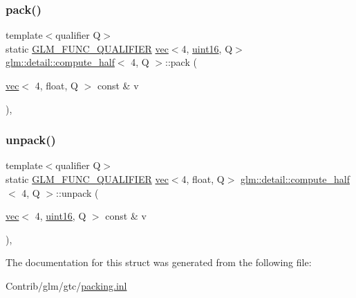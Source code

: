 \subsubsection{\texorpdfstring{pack()}{pack()}}
{\footnotesize\ttfamily template$<$qualifier Q$>$ \\
static \mbox{\hyperlink{setup_8hpp_a33fdea6f91c5f834105f7415e2a64407}{G\+L\+M\+\_\+\+F\+U\+N\+C\+\_\+\+Q\+U\+A\+L\+I\+F\+I\+ER}} \mbox{\hyperlink{structglm_1_1vec}{vec}}$<$4, \mbox{\hyperlink{namespaceglm_1_1detail_a47b2a7d006d187338e8031a352d1ce56}{uint16}}, Q$>$ \mbox{\hyperlink{structglm_1_1detail_1_1compute__half}{glm\+::detail\+::compute\+\_\+half}}$<$ 4, Q $>$\+::pack (\begin{DoxyParamCaption}\item[{\mbox{\hyperlink{structglm_1_1vec}{vec}}$<$ 4, float, Q $>$ const \&}]{v }\end{DoxyParamCaption})\hspace{0.3cm}{\ttfamily [inline]}, {\ttfamily [static]}}

\mbox{\label{structglm_1_1detail_1_1compute__half_3_014_00_01_q_01_4_a0e7bc963552dffae7fc20fc5dc2e810e}} 
\subsubsection{\texorpdfstring{unpack()}{unpack()}}
{\footnotesize\ttfamily template$<$qualifier Q$>$ \\
static \mbox{\hyperlink{setup_8hpp_a33fdea6f91c5f834105f7415e2a64407}{G\+L\+M\+\_\+\+F\+U\+N\+C\+\_\+\+Q\+U\+A\+L\+I\+F\+I\+ER}} \mbox{\hyperlink{structglm_1_1vec}{vec}}$<$4, float, Q$>$ \mbox{\hyperlink{structglm_1_1detail_1_1compute__half}{glm\+::detail\+::compute\+\_\+half}}$<$ 4, Q $>$\+::unpack (\begin{DoxyParamCaption}\item[{\mbox{\hyperlink{structglm_1_1vec}{vec}}$<$ 4, \mbox{\hyperlink{namespaceglm_1_1detail_a47b2a7d006d187338e8031a352d1ce56}{uint16}}, Q $>$ const \&}]{v }\end{DoxyParamCaption})\hspace{0.3cm}{\ttfamily [inline]}, {\ttfamily [static]}}



The documentation for this struct was generated from the following file\+:\begin{DoxyCompactItemize}
\item 
Contrib/glm/gtc/\mbox{\hyperlink{packing_8inl}{packing.\+inl}}\end{DoxyCompactItemize}
